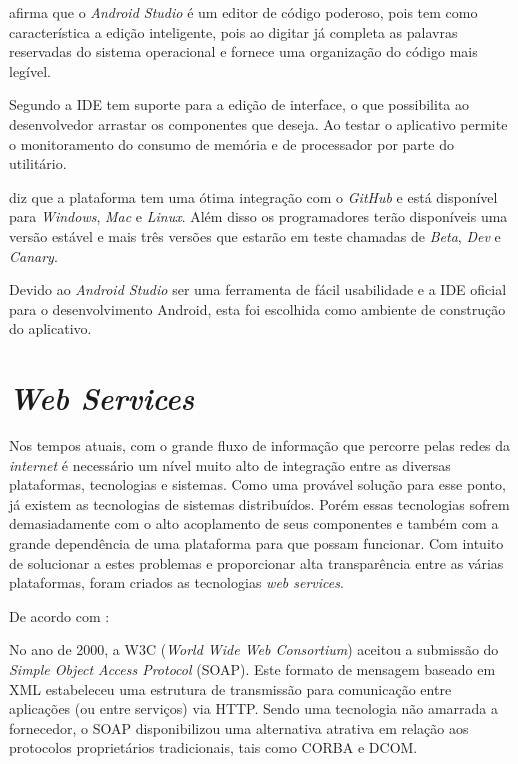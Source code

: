	\par {} afirma que o \textit{Android Studio} é um editor
de código poderoso, pois tem como característica a edição inteligente, pois ao
digitar já completa as palavras reservadas do sistema operacional e fornece uma
organização do código mais legível.

	\par Segundo  a IDE tem suporte para a edição de
interface, o que possibilita ao desenvolvedor arrastar os componentes que
deseja. Ao testar o aplicativo permite o monitoramento do consumo de memória e
de processador por parte do utilitário.

	\par {} diz que a plataforma tem uma ótima integração com
o \textit{GitHub} e está disponível para \textit{Windows}, \textit{Mac} e
\textit{Linux}. Além disso os programadores terão disponíveis uma versão
estável e mais três versões que estarão em teste chamadas de \textit{Beta},
\textit{Dev} e \textit{Canary}.

	\par Devido ao \textit{Android Studio} ser uma ferramenta de fácil usabilidade
e a IDE oficial para o desenvolvimento Android, esta foi escolhida como ambiente de
construção do aplicativo.	
	
\section{\textit{Web Services}}
	
	\par Nos tempos atuais, com o grande fluxo de informação que percorre pelas
redes da \textit{internet} é necessário um nível muito alto de integração entre
as diversas plataformas, tecnologias e sistemas. Como uma provável solução para
esse ponto, já existem as tecnologias de sistemas distribuídos. Porém essas
tecnologias sofrem demasiadamente com o alto acoplamento de seus componentes e
também com a grande dependência de uma plataforma para que possam funcionar. Com
intuito de solucionar a estes problemas e proporcionar alta transparência entre
as várias plataformas, foram criados as tecnologias \textit{web services}.
	
	
	\par De acordo com :
	\begin{citacao}
		No ano de 2000, a W3C (\textit{World Wide Web Consortium}) aceitou a submissão
		do \textit{Simple Object Access Protocol} (SOAP). Este formato de mensagem
		baseado em XML estabeleceu uma estrutura de transmissão para comunicação entre
		aplicações (ou entre serviços) via HTTP. Sendo uma tecnologia não amarrada a
		fornecedor, o SOAP disponibilizou uma alternativa atrativa em relação aos
		protocolos proprietários tradicionais, tais como CORBA e DCOM.
	\end{citacao}
	

